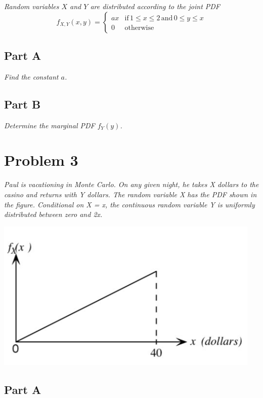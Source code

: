 \documentclass{article}
\begin{document}
\textit{Random variables $ X $ and $ Y $ are distributed according to the
joint PDF}
$$ f_{X,Y}(x, y) = \begin{cases}
    ax & \mathrm{if} \, 1 \leq x \leq 2 \, \mathrm{and} \, 0 \leq y \leq x \\
    0 & \mathrm{otherwise}
\end{cases} $$

\subsection*{Part A}

\textit{Find the constant $ a $.}

\subsection*{Part B}

\textit{Determine the marginal PDF $ f_Y(y) $.}

\section*{Problem 3}

\textit{Paul is vacationing in Monte Carlo. On any given night, he takes X
dollars to the casino and returns with Y dollars. The random variable X has
the PDF shown in the figure. Conditional on X = x, the continuous random
variable Y is uniformly distributed between zero and 2x.}

\begin{center}
    \includegraphics[scale=1]{Images/P3.PNG}
\end{center}

\subsection*{Part A}
\end{document}
